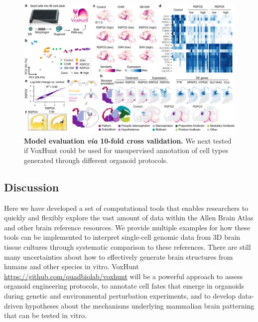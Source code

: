 \begin{figure}[t!]
    \centering
	\includegraphics[width=\textwidth]{figures/voxhunt/Figure_7}
    \caption{\textbf{Model evaluation \textit{via} 10-fold cross validation.} We next tested if VoxHunt could be used for unsupervised annotation of cell types generated through different organoid protocols.}
    \label{fig:vox7}
\end{figure}



\subsection{Discussion}
Here we have developed a set of computational tools that enables researchers to quickly and flexibly explore the vast amount of data within the Allen Brain Atlas and other brain reference resources. We provide multiple examples for how these tools can be implemented to interpret single-cell genomic data from 3D brain tissue cultures through systematic comparison to these references. There are still many uncertainties about how to effectively generate brain structures from humans and other species in vitro. VoxHunt \href{https://github.com/quadbiolab/voxhunt}{https://github.com/quadbiolab/voxhunt} will be a powerful approach to assess organoid engineering protocols, to annotate cell fates that emerge in organoids during genetic and environmental perturbation experiments, and to develop data-driven hypotheses about the mechanisms underlying mammalian brain patterning that can be tested in vitro. 

